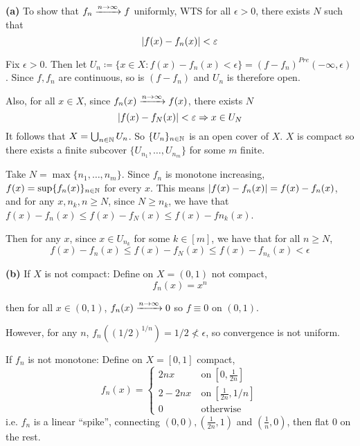 \documentclass[a4paper, 12pt]{article}
\begin{document}
\begin{solution}
    \textbf{(a)} To show that $f_n \xrightarrow{n \to \infty} f$ uniformly, WTS for all $\epsilon > 0$, there exists $N$ such that \begin{equation*}
    \lvert f(x) - f_n(x)\rvert < \varepsilon
    \end{equation*}

    Fix $\epsilon > 0$. Then let $U_n \coloneqq \{x \in X : f(x) - f_n(x) < \epsilon\} = (f-f_n)^{Pre}(-\infty, \epsilon)$. Since $f, f_n$ are continuous, so is $(f-f_n)$ and $U_n$ is therefore open.

    Also, for all $x \in X$, since $f_n(x) \xrightarrow{n \to \infty} f(x)$, there exists $N$ \begin{equation*}
    \lvert f(x) - f_N(x)\rvert < \varepsilon \Rightarrow x \in U_N
    \end{equation*}
    It follows that $X = \bigcup_{n \in \mathbb{N}} U_n$. So $\{U_n\}_{n \in \mathbb{N}}$ is an open cover of $X$. $X$ is compact so there exists a finite subcover $\{U_{n_1}, \ldots, U_{n_m}\}$ for some $m$ finite.

    Take $N = \max\{n_1, \ldots, n_m\}$. Since $f_n$ is monotone increasing, $f(x) = \sup \{f_n(x)\}_{n \in \mathbb{N}}$ for every $x$. This means $\lvert f(x) - f_n(x)\rvert = f(x) - f_n(x)$, and for any $x, n_k, n \geq N$, since $N \geq n_k$, we have that $f(x) - f_n(x) \leq f(x) - f_N(x) \leq f(x) - f{n_k}(x)$.
    
    Then for any $x$, since $x \in U_{n_k}$ for some $k \in [m]$, we have that for all $n \geq N$,
    \begin{equation*}
    f(x) - f_n(x) \leq f(x) - f_N(x) \leq f(x) - f_{n_k}(x) < \epsilon
    \end{equation*}

    \textbf{(b)} If $X$ is not compact: Define on $X = (0, 1)$ not compact, \begin{equation*}
        f_n(x) = x^n
    \end{equation*}

    then for all $x \in (0, 1)$, $f_n(x) \xrightarrow{n \to \infty} 0$ so $f \equiv 0$ on $(0, 1)$.

    However, for any $n$, $f_n((1/2)^{1/n}) = 1/2 \not < \epsilon$, so convergence is not uniform.

    If $f_n$ is not monotone: Define on $X = [0, 1]$ compact,
    \begin{equation*} 
    f_n(x) = \begin{cases}
        2nx & \:\text{on}\: [0, \frac{1}{2n}] \\
        2 - 2nx & \:\text{on}\: [\frac{1}{2n}, 1/n] \\
        0 & \:\text{otherwise}\: 
    \end{cases}
    \end{equation*}
    i.e. $f_n$ is a linear ``spike'', connecting $(0, 0), \left(\frac{1}{2n}, 1\right)$ and $\left(\frac{1}{n}, 0\right)$, then flat 0 on the rest.


\end{solution}
\end{document}
